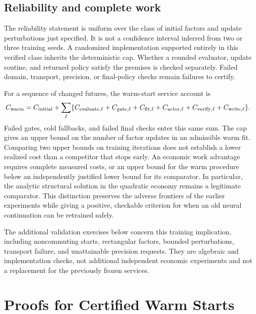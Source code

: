\documentclass[ecta,nameyear,draft]{econsocart}
\theoremstyle{definition}
\theoremstyle{remark}
\begin{document}
\subsection{Reliability and complete work}
The reliability statement is uniform over the class of initial factors and
update perturbations just specified. It is not a confidence interval inferred
from two or three training seeds. A randomized implementation supported
entirely in this verified class inherits the deterministic cap. Whether a
rounded evaluator, update routine, and returned policy satisfy the premises
is checked separately. Failed domain, transport, precision, or final-policy
checks remain failures to certify.

For a sequence of changed futures, the warm-start service account is
\begin{equation}\label{eq:r33work}
 C_{\rm warm}=C_{\rm initial}+\sum_\ell
 \{C_{\rm evaluate,\ell}+C_{\rm gate,\ell}
   +C_{\rm fit,\ell}+C_{\rm actor,\ell}
   +C_{\rm verify,\ell}+C_{\rm write,\ell}\}.
\end{equation}
Failed gates, cold fallbacks, and failed final checks enter this same sum.
The cap gives an upper bound on the number of factor updates in an admissible
warm fit. Comparing two upper bounds on training iterations does not establish
a lower realized cost than a competitor that stops early. An economic work
advantage requires complete measured costs, or an upper bound for the warm
procedure below an independently justified lower bound for its comparator.
In particular, the analytic structural solution in the quadratic economy
remains a legitimate comparator. This distinction preserves the adverse
frontiers of the earlier experiments while giving a positive, checkable
criterion for when an old neural continuation can be retrained safely.

The additional validation exercises below concern this training implication,
including noncommuting starts, rectangular factors, bounded perturbations,
transport failure, and unattainable precision requests. They are algebraic
and implementation checks, not additional independent economic experiments
and not a replacement for the previously frozen services.

\section{Proofs for Certified Warm Starts}\label{sec:r33proofs}
\end{document}
